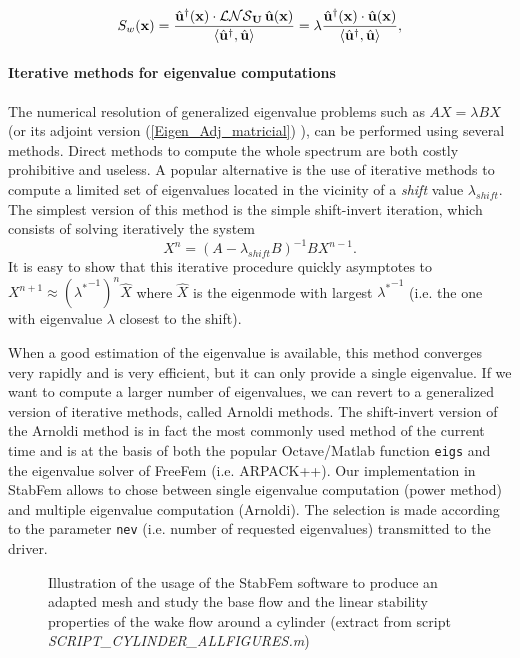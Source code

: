 \documentclass[twocolumn,10pt]{asme2ej}
\newcommand{\be}[1]{ \begin{equation} \label{#1}}
\newcommand{\ee}{\end{equation}}
\begin{document}
\be{Endo} 
S_w({\bf x}) =  \frac{  \hat{\bf u}^\dag({\bf x}) \cdot  {\cal LNS}_{\bf U} \, \hat{\bf u}({\bf x})  }{{\left<\hat{\bf u}^\dag, \hat{\bf u}\right>}}  
= \lambda \frac{ \hat{\bf u}^\dag({\bf x}) \cdot \hat{\bf u}({\bf x}) }{{\left<\hat{\bf u}^\dag, \hat{\bf u}\right>}},
\ee 


\paragraph{Iterative methods for eigenvalue computations}

The numerical resolution of generalized eigenvalue problems such as $A X = \lambda B X$ (or its adjoint version (\ref{Eigen_Adj_matricial}) ), 
can be performed using several methods. Direct methods to compute the whole spectrum are both costly prohibitive and useless. A popular alternative is the use of iterative methods to compute a limited set of eigenvalues located in the vicinity of a 
{\em shift} value $\lambda_{shift}$. The simplest version of this method is the simple shift-invert iteration, which consists of solving iteratively the system
$$
X^{n} =  (A- \lambda_{shift} B)^{-1} B X^{n-1}.
$$ 
It is easy to show that this iterative procedure quickly asymptotes to $X^{n+1} \approx ({\lambda^*}^{-1})^n \hat{X}$
where $\hat{X}$ is the eigenmode with largest ${\lambda^*}^{-1}$ (i.e. the one with eigenvalue $\lambda$ closest to the shift). 


When a good estimation of the eigenvalue is available, this method converges very rapidly and is very efficient, but it can only provide a single eigenvalue.
If we want to compute a larger number of eigenvalues, we can revert to a generalized version of iterative methods, called Arnoldi methods\cite{Arnoldi51}. The shift-invert version of the Arnoldi method is in fact the most commonly used method of the current time and is at the basis of both the popular Octave/Matlab function {\tt{eigs}} and the eigenvalue solver of FreeFem (i.e. ARPACK++). Our implementation in StabFem allows to chose between single eigenvalue computation (power method) and multiple eigenvalue computation (Arnoldi). The selection is made according to the parameter \verb|nev|  (i.e. number of requested eigenvalues) transmitted to the driver.


\begin{figure*}[t]
\small

 \normalsize
\caption{Illustration of the usage of the StabFem software to produce an adapted mesh and study the base flow and the linear stability properties of the wake flow around a cylinder 
(extract from script {\em SCRIPT\_CYLINDER\_ALLFIGURES.m})}
\label{Listing2}
\end{figure*}
\end{document}
